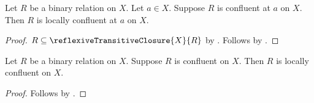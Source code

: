 \begin{proposition}\label{confluent_at_implies_locally_confluent_at}
    Let $R$ be a binary relation on $X$.
    Let $a\in X$.
    Suppose $R$ is confluent at $a$ on $X$.
    Then $R$ is locally confluent at $a$ on $X$.
\end{proposition}
\begin{proof}
    $R\subseteq\reflexiveTransitiveClosure{X}{R}$
        by .
    Follows by .
\end{proof}

\begin{proposition}\label{confluent_on_implies_locally_confluent_on}
    Let $R$ be a binary relation on $X$.
    Suppose $R$ is confluent on $X$.
    Then $R$ is locally confluent on $X$.
\end{proposition}
\begin{proof}
    Follows by .
\end{proof}


